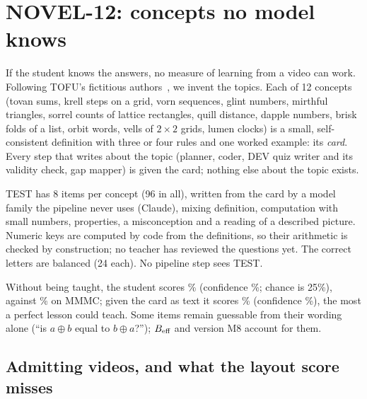 \section{NOVEL-12: concepts no model knows}\label{sec:novel}


If the student knows the answers, no measure of learning from a video can work. Following TOFU's fictitious
authors~\cite{tofu}, we invent the topics. Each of 12 concepts (tovan sums, krell steps on a grid, vorn sequences,
glint numbers, mirthful triangles, sorrel counts of lattice rectangles, quill distance, dapple numbers, brisk folds of
a list, orbit words, vells of $2\times2$ grids, lumen clocks) is a small, self-consistent definition with three or four
rules and one worked example: its \emph{card}. Every step that writes about the topic (planner, coder, DEV quiz writer
and its validity check, gap mapper) is given the card; nothing else about the topic exists.

TEST has 8 items per concept (96 in all), written from the card by a model family the pipeline never uses (Claude),
mixing definition, computation with small numbers, properties, a misconception and a reading of a described picture.
Numeric keys are computed by code from the definitions, so their arithmetic is checked by construction; no teacher
has reviewed the questions yet. The correct letters are balanced (24 each). No pipeline step sees TEST.

Without being taught, the student scores \novelpriorGemmaAcc\% (confidence \novelpriorGemmaP\%; chance is 25\%), against
\mmmcpriorGemmaAcc\% on MMMC; given the card as text it scores \novelcardGemmaAcc\% (confidence \novelcardGemmaP\%), the
most a perfect lesson could teach. Some items remain guessable from their wording alone (``is $a \oplus b$ equal to
$b \oplus a$?''); $B_{\text{eff}}$ and version M8 account for them.



\subsection{Admitting videos, and what the layout score misses}\label{sec:quality}

